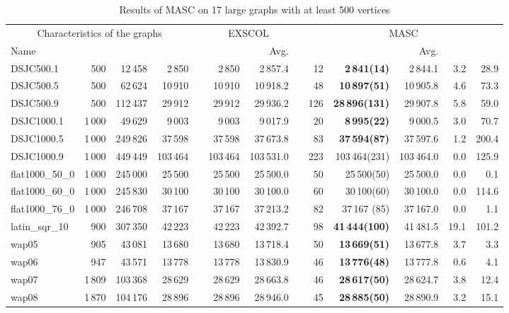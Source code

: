\documentclass{elsart}
\begin{document}
\begin{table}\begin{scriptsize}
\caption{Results of MASC on 17 large graphs with at least 500 vertices}
\label{table_MASC_large}
\begin{tabular}{lrrrcrrcrrrrr}
\hline
\multicolumn{4}{c}{Characteristics of the graphs} && \multicolumn{2}{c}{EXSCOL} && \multicolumn{5}{c}{MASC}\\
\cline{1-4}\cline{6-7}\cline{9-13}
Name &  &  &   &&  & Avg.&&  & & Avg. &  &  \\
\hline
DSJC500.1    & 500 & 12\,458   &2\,850 &&2\,850 & 2\,857.4&&12&  \textbf{2\,841(14)} & 2\,844.1&3.2  & 28.9  \\
DSJC500.5    & 500 & 62\,624  &10\,910 &&10\,910 & 10\,918.2  &&48& \textbf{10\,897(51)}  & 10\,905.8 &4.6 & 73.3 \\
DSJC500.9    & 500 & 112\,437  &29\,912 &&29\,912 &29\,936.2 &&126&  \textbf{ 28\,896(131)} & 29\,907.8&5.8  & 59.0  \\
DSJC1000.1    &1\,000 & 49\,629   & 9\,003 && 9\,003 &9\,017.9 &&20&  \textbf{8\,995(22)}  & 9\,000.5&3.0  & 70.7  \\
DSJC1000.5    &1\,000 & 249\,826  &37\,598 &&37\,598 & 37\,673.8  &&83&  \textbf{37\,594(87)} &37\,597.6  &1.2 & 200.4 \\
DSJC1000.9    &1\,000 & 449\,449  &103\,464 &&103\,464 &103\,531.0&&223& 103\,464(231) & 103\,464.0& 0.0 & 125.9  \\

flat1000\_50\_0    & 1\,000 & 245\,000 & 25\,500 && 25\,500 &25\,500.0 &&50& 25\,500(50) & 25\,500.0&0.0 & 0.1 \\
flat1000\_60\_0    & 1\,000 & 245\,830 & 30\,100 && 30\,100 &30\,100.0 &&60& 30\,100(60) & 30\,100.0&0.0 & 114.6 \\
flat1000\_76\_0    & 1\,000 & 246\,708 & 37\,167 && 37\,167 &37\,213.2 &&82& 37\,167 (85) &37\,167.0 &0.0  &1.1  \\

latin\_sqr\_10    & 900 &307\,350 &42\,223 &&42\,223 &42\,392.7 &&98&  \textbf{41\,444(100)}& 41\,481.5&19.1  & 101.2 \\

wap05    & 905 & 43\,081 &13\,680 &&13\,680 &13\,718.4 &&50&  \textbf{13\,669(51)} & 13\,677.8&3.7  & 3.3 \\
wap06    & 947 & 43\,571 &13\,778 &&13\,778 &13\,830.9 &&46&  \textbf{13\,776(48)} & 13\,777.8&0.6 & 4.1 \\
wap07    & 1\,809 & 103\,368 &28\,629 &&28\,629 &28\,663.8 &&46&  \textbf{28\,617(50)} & 28\,624.7&3.8 & 12.4\\
wap08    & 1\,870 & 104\,176 &28\,896 &&28\,896 &28\,946.0 &&45&  \textbf{28\,885(50)} & 28\,890.9&3.2 & 15.1 \\


\end{tabular}
\end{scriptsize}
\end{table}
\end{document}
